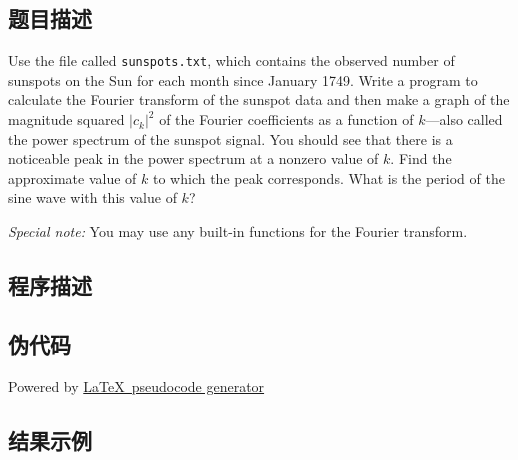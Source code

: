 \subsection{题目描述}
\noindent Use the file called \texttt{sunspots.txt}, which contains the observed number of sunspots on the Sun for each month since January 1749. Write a program to calculate the Fourier transform of the sunspot data and then make a graph of the magnitude squared \( |c_k|^2 \) of the Fourier coefficients as a function of \( k \)—also called the power spectrum of the sunspot signal. You should see that there is a noticeable peak in the power spectrum at a nonzero value of \( k \). Find the approximate value of \( k \) to which the peak corresponds. What is the period of the sine wave with this value of \( k \)?

\noindent \textit{Special note:} You may use any built-in functions for the Fourier transform.


\subsection{程序描述}

\subsection{伪代码}
Powered by \href{https://chatgpt.com/g/g-xJJAA2awf-latex-pseudocode-generator}{\LaTeX \ pseudocode generator}

\subsection{结果示例}

